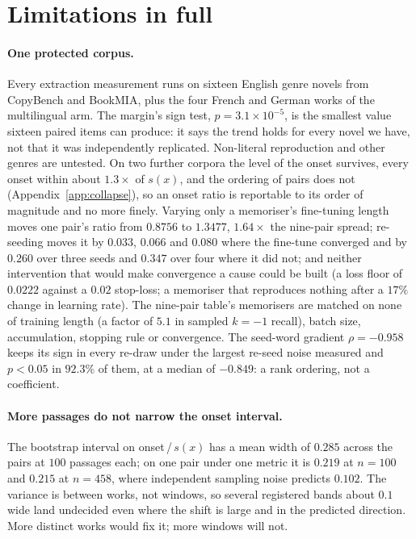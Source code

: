 \section{Limitations in full}\label{app:limitations}

\paragraph{One protected corpus.}
Every extraction measurement runs on sixteen English genre novels from CopyBench and BookMIA, plus the
four French and German works of the multilingual arm. The margin's sign test, $p = 3.1\times10^{-5}$, is
the smallest value sixteen paired items can produce: it says the trend holds for every novel we have, not
that it was independently replicated. Non-literal reproduction and other genres are untested. On two
further corpora the level of the onset survives, every onset within about $1.3\times$ of $s(x)$, and the
ordering of pairs does not (Appendix~\ref{app:collapse}), so an onset ratio is reportable to its order of
magnitude and no more finely. Varying only a memoriser's fine-tuning length moves one pair's ratio from
$0.8756$ to $1.3477$, $1.64\times$ the nine-pair spread; re-seeding moves it by $0.033$, $0.066$ and $0.080$
where the fine-tune converged and by $0.260$ over three seeds and $0.347$ over four where it did not; and
neither intervention that would make convergence a cause could be built (a loss floor of $0.0222$ against
a $0.02$ stop-loss; a memoriser that reproduces nothing after a $17\%$ change in learning rate). The
nine-pair table's memorisers are matched on none of training length (a factor of $5.1$ in sampled $k=-1$
recall), batch size, accumulation, stopping rule or convergence. The seed-word gradient $\rho = -0.958$ keeps
its sign in every re-draw under the largest re-seed noise measured and $p<0.05$ in $92.3\%$ of them, at a
median of $-0.849$: a rank ordering, not a coefficient.

\paragraph{More passages do not narrow the onset interval.}
The bootstrap interval on onset\,/\,$s(x)$ has a mean width of $0.285$ across the pairs at $100$ passages
each; on one pair under one metric it is $0.219$ at $n=100$ and $0.215$ at $n=458$, where independent
sampling noise predicts $0.102$. The variance is between works, not windows, so several registered bands
about $0.1$ wide land undecided even where the shift is large and in the predicted direction. More distinct
works would fix it; more windows will not.

